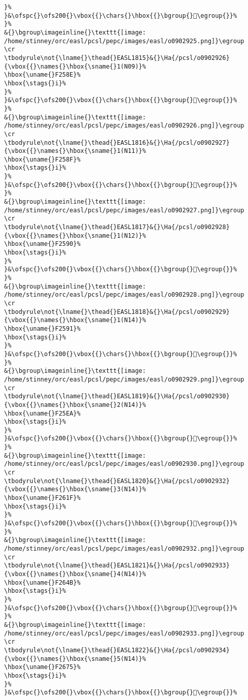 \begin{verbatim}
}%
}&\ofspc{}\ofs200{}\vbox{{}\chars{}\hbox{{}\bgroup{}󰄬\egroup{}}%
}%
&{}\bgroup\imageinline{}\texttt{[image: /home/stinney/orc/easl/pcsl/pepc/images/easl/o0902925.png]}\egroup
\cr
\tbodyrule\not{\lname{}\thead{}EASL1815}&{}\Ha{/pcsl/o0902926}{\vbox{{}\names{}\hbox{\sname{}1(N09)}%
\hbox{\uname{}F258E}%
\hbox{\stags{}i}%
}%
}&\ofspc{}\ofs200{}\vbox{{}\chars{}\hbox{{}\bgroup{}󲖎\egroup{}}%
}%
&{}\bgroup\imageinline{}\texttt{[image: /home/stinney/orc/easl/pcsl/pepc/images/easl/o0902926.png]}\egroup
\cr
\tbodyrule\not{\lname{}\thead{}EASL1816}&{}\Ha{/pcsl/o0902927}{\vbox{{}\names{}\hbox{\sname{}1(N11)}%
\hbox{\uname{}F258F}%
\hbox{\stags{}i}%
}%
}&\ofspc{}\ofs200{}\vbox{{}\chars{}\hbox{{}\bgroup{}󲖏\egroup{}}%
}%
&{}\bgroup\imageinline{}\texttt{[image: /home/stinney/orc/easl/pcsl/pepc/images/easl/o0902927.png]}\egroup
\cr
\tbodyrule\not{\lname{}\thead{}EASL1817}&{}\Ha{/pcsl/o0902928}{\vbox{{}\names{}\hbox{\sname{}1(N12)}%
\hbox{\uname{}F2590}%
\hbox{\stags{}i}%
}%
}&\ofspc{}\ofs200{}\vbox{{}\chars{}\hbox{{}\bgroup{}󲖐\egroup{}}%
}%
&{}\bgroup\imageinline{}\texttt{[image: /home/stinney/orc/easl/pcsl/pepc/images/easl/o0902928.png]}\egroup
\cr
\tbodyrule\not{\lname{}\thead{}EASL1818}&{}\Ha{/pcsl/o0902929}{\vbox{{}\names{}\hbox{\sname{}1(N14)}%
\hbox{\uname{}F2591}%
\hbox{\stags{}i}%
}%
}&\ofspc{}\ofs200{}\vbox{{}\chars{}\hbox{{}\bgroup{}󲖑\egroup{}}%
}%
&{}\bgroup\imageinline{}\texttt{[image: /home/stinney/orc/easl/pcsl/pepc/images/easl/o0902929.png]}\egroup
\cr
\tbodyrule\not{\lname{}\thead{}EASL1819}&{}\Ha{/pcsl/o0902930}{\vbox{{}\names{}\hbox{\sname{}2(N14)}%
\hbox{\uname{}F25EA}%
\hbox{\stags{}i}%
}%
}&\ofspc{}\ofs200{}\vbox{{}\chars{}\hbox{{}\bgroup{}󲗪\egroup{}}%
}%
&{}\bgroup\imageinline{}\texttt{[image: /home/stinney/orc/easl/pcsl/pepc/images/easl/o0902930.png]}\egroup
\cr
\tbodyrule\not{\lname{}\thead{}EASL1820}&{}\Ha{/pcsl/o0902932}{\vbox{{}\names{}\hbox{\sname{}3(N14)}%
\hbox{\uname{}F261F}%
\hbox{\stags{}i}%
}%
}&\ofspc{}\ofs200{}\vbox{{}\chars{}\hbox{{}\bgroup{}󲘟\egroup{}}%
}%
&{}\bgroup\imageinline{}\texttt{[image: /home/stinney/orc/easl/pcsl/pepc/images/easl/o0902932.png]}\egroup
\cr
\tbodyrule\not{\lname{}\thead{}EASL1821}&{}\Ha{/pcsl/o0902933}{\vbox{{}\names{}\hbox{\sname{}4(N14)}%
\hbox{\uname{}F264B}%
\hbox{\stags{}i}%
}%
}&\ofspc{}\ofs200{}\vbox{{}\chars{}\hbox{{}\bgroup{}󲙋\egroup{}}%
}%
&{}\bgroup\imageinline{}\texttt{[image: /home/stinney/orc/easl/pcsl/pepc/images/easl/o0902933.png]}\egroup
\cr
\tbodyrule\not{\lname{}\thead{}EASL1822}&{}\Ha{/pcsl/o0902934}{\vbox{{}\names{}\hbox{\sname{}5(N14)}%
\hbox{\uname{}F2675}%
\hbox{\stags{}i}%
}%
}&\ofspc{}\ofs200{}\vbox{{}\chars{}\hbox{{}\bgroup{}󲙵\egroup{}}%

\end{verbatim}

